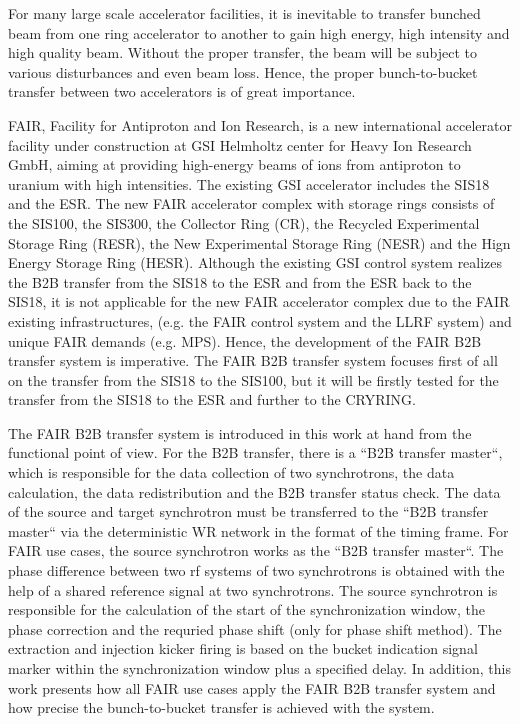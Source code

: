 For many large scale accelerator facilities, it is inevitable to transfer bunched beam from one ring accelerator to another to gain high energy, high intensity and high quality beam. Without the proper transfer, the beam will be subject to various disturbances and even beam loss. Hence, the proper bunch-to-bucket transfer between two accelerators is of great importance. 

FAIR, Facility for Antiproton and Ion Research, is a new international accelerator facility under construction at GSI Helmholtz center for Heavy Ion Research GmbH, aiming at providing high-energy beams of ions from antiproton to uranium with high intensities. The existing GSI accelerator includes the SIS18 and the ESR. The new FAIR accelerator complex with storage rings consists of the SIS100, the SIS300, the Collector Ring (CR), the Recycled Experimental Storage Ring (RESR), the New Experimental Storage Ring (NESR) and the Hign Energy Storage Ring (HESR). Although the existing GSI control system realizes the B2B transfer from the SIS18 to the
ESR and from the ESR back to the SIS18, it is not applicable for the new FAIR accelerator complex due to the FAIR existing infrastructures, (e.g. the FAIR control system and the LLRF system) and unique FAIR demands (e.g. MPS). Hence, the development of the FAIR B2B transfer system is imperative. The FAIR B2B transfer system focuses first of all on the transfer from the SIS18 to the SIS100, but it will be firstly tested for the transfer from the SIS18 to the ESR and further to the CRYRING.   

The FAIR B2B transfer system is introduced in this work at hand from the functional point of view. For the B2B transfer, there is a “B2B transfer master“, which is responsible for the data collection of two synchrotrons, the data calculation, the data redistribution and the B2B transfer status check. The data of the source and target synchrotron must be transferred to the “B2B transfer master“ via the deterministic WR network in the format of the timing frame. For FAIR use cases, the source synchrotron works as the ``B2B transfer master``. The phase difference between two rf systems of two synchrotrons is obtained with the help of a shared reference signal at two synchrotrons. The source synchrotron is responsible for the calculation of the start of the synchronization window, the phase correction and the requried phase shift (only for phase shift method). The extraction and injection kicker firing is based on the bucket indication signal marker within the synchronization window plus a specified delay. In addition, this work presents how all FAIR use cases apply the FAIR B2B transfer system and how precise the bunch-to-bucket transfer is achieved with the system. 

